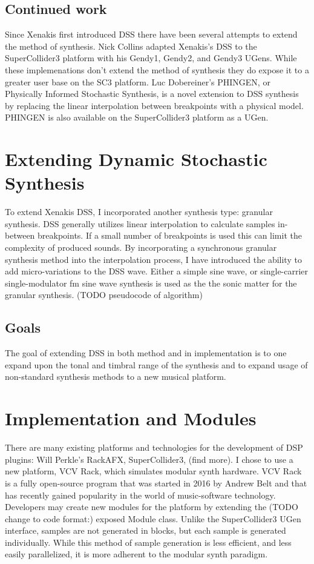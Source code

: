 \documentclass[10pt]{article}
\begin{document}
\subsection{Continued work}
Since Xenakis first introduced DSS there have been several attempts to extend the method of synthesis. Nick Collins adapted Xenakis's DSS to the SuperCollider3 platform with his Gendy1, Gendy2, and Gendy3 UGens. While these implemenations don't extend the method of synthesis they do expose it to a greater user base on the SC3 platform. Luc Dobereiner's PHINGEN, or Physically Informed Stochastic Synthesis, is a novel extension to DSS synthesis by replacing the linear interpolation between breakpoints with a physical model.\citep{luc2011dobereiner} PHINGEN is also available on the SuperCollider3 platform as a UGen.

\section{Extending Dynamic Stochastic Synthesis}
To extend Xenakis DSS, I incorporated another synthesis type: granular synthesis. DSS generally utilizes linear interpolation to calculate samples in-between breakpoints. If a small number of breakpoints is used this can limit the complexity of produced sounds. By incorporating a synchronous granular synthesis method into the interpolation process, I have introduced the ability to add micro-variations to the DSS wave. Either a simple sine wave, or single-carrier single-modulator fm sine wave synthesis is used as the the sonic matter for the granular synthesis. (TODO pseudocode of algorithm)

\subsection{Goals}
The goal of extending DSS in both method and in implementation is to one expand upon the tonal and timbral range of the synthesis and to expand usage of non-standard synthesis methods to a new musical platform. 

\section{Implementation and Modules}
There are many existing platforms and technologies for the development of DSP plugins: Will Perkle's RackAFX, SuperCollider3, (find more).\citep{rackafx} I chose to use a new platform, VCV Rack, which simulates modular synth hardware. VCV Rack is a fully open-source program that was started in 2016 by Andrew Belt and that has recently gained popularity in the world of music-software technology.\citep{vcvrack} Developers may create new modules for the platform by extending the (TODO change to code format:) exposed Module class. Unlike the SuperCollider3 UGen interface, samples are not generated in blocks, but each sample is generated individually. While this method of sample generation is less efficient, and less easily parallelized, it is more adherent to the modular synth paradigm.
\end{document}
